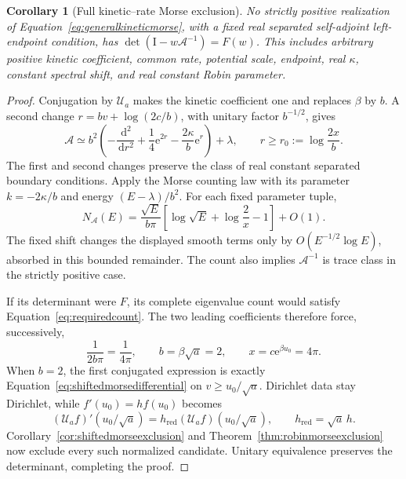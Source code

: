 \documentclass[11pt,letterpaper]{article}
\numberwithin{equation}{section}
\newtheorem{corollary}[theorem]{Corollary}
\theoremstyle{definition}
\theoremstyle{remark}
\newcommand{\Id}{\mathrm I}
\newcommand{\dd}{\,\mathrm d}
\newcommand{\e}{\mathrm e}
\begin{document}
\begin{corollary}[Full kinetic--rate Morse exclusion]
\label{cor:kineticratemorseexclusion}
No strictly positive realization of Equation~\eqref{eq:generalkineticmorse}, with a fixed real separated self-adjoint left-endpoint condition, has
$\det(\Id-w\mathcal A^{-1})=F(w)$. This includes arbitrary positive kinetic coefficient, common rate, potential scale, endpoint, real $\kappa$, constant spectral shift, and real constant Robin parameter.
\end{corollary}
\begin{proof}
Conjugation by $\mathcal U_a$ makes the kinetic coefficient one and replaces $\beta$ by $b$. A second change $r=bv+\log(2c/b)$, with unitary factor $b^{-1/2}$, gives
\begin{equation}
 \mathcal A\simeq b^2\left(-\frac{\dd^2}{\dd r^2}
             +\frac14\e^{2r}-\frac{2\kappa}{b}\e^r\right)+\lambda,
 \qquad r\geq r_0:=\log\frac{2x}{b}.
 \label{eq:generalmorsereduction}
\end{equation}
The first and second changes preserve the class of real constant separated boundary conditions. Apply the Morse counting law \cite[Theorem~3.2]{lagarias} with its parameter $k=-2\kappa/b$ and energy $(E-\lambda)/b^2$. For each fixed parameter tuple,
\begin{equation}
 N_{\mathcal A}(E)=\frac{\sqrt E}{b\pi}
       \left[\log\sqrt E+\log\frac2x-1\right]+O(1).
 \label{eq:kineticratecount}
\end{equation}
The fixed shift changes the displayed smooth terms only by $O(E^{-1/2}\log E)$, absorbed in this bounded remainder. The count also implies $\mathcal A^{-1}$ is trace class in the strictly positive case.

If its determinant were $F$, its complete eigenvalue count would satisfy Equation~\eqref{eq:requiredcount}. The two leading coefficients therefore force, successively,
\begin{equation}
 \frac{1}{2b\pi}=\frac{1}{4\pi},\qquad
 b=\beta\sqrt a=2,\qquad x=c\e^{\beta u_0}=4\pi.
 \label{eq:kineticratecalibration}
\end{equation}
When $b=2$, the first conjugated expression is exactly Equation~\eqref{eq:shiftedmorsedifferential} on $v\geq u_0/\sqrt a$. Dirichlet data stay Dirichlet, while $f'(u_0)=hf(u_0)$ becomes
\begin{equation}
 (\mathcal U_af)'(u_0/\sqrt a)
 =h_{\mathrm{red}}(\mathcal U_af)(u_0/\sqrt a),
 \qquad h_{\mathrm{red}}=\sqrt a\,h.
 \label{eq:kineticrobintransport}
\end{equation}
Corollary~\ref{cor:shiftedmorseexclusion} and Theorem~\ref{thm:robinmorseexclusion} now exclude every such normalized candidate. Unitary equivalence preserves the determinant, completing the proof.
\end{proof}
\end{document}
